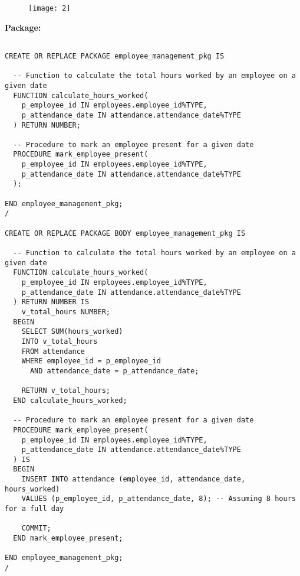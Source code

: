 \documentclass[11pt]{article} %
\begin{document}
\begin{figure}[h!]
  \centering
  \texttt{[image: 2]}
\end{figure}

\pagebreak

\textbf{Package:}

\begin{small}
\begin{verbatim}

CREATE OR REPLACE PACKAGE employee_management_pkg IS
  
  -- Function to calculate the total hours worked by an employee on a given date
  FUNCTION calculate_hours_worked(
    p_employee_id IN employees.employee_id%TYPE,
    p_attendance_date IN attendance.attendance_date%TYPE
  ) RETURN NUMBER;

  -- Procedure to mark an employee present for a given date
  PROCEDURE mark_employee_present(
    p_employee_id IN employees.employee_id%TYPE,
    p_attendance_date IN attendance.attendance_date%TYPE
  );

END employee_management_pkg;
/

CREATE OR REPLACE PACKAGE BODY employee_management_pkg IS

  -- Function to calculate the total hours worked by an employee on a given date
  FUNCTION calculate_hours_worked(
    p_employee_id IN employees.employee_id%TYPE,
    p_attendance_date IN attendance.attendance_date%TYPE
  ) RETURN NUMBER IS
    v_total_hours NUMBER;
  BEGIN
    SELECT SUM(hours_worked)
    INTO v_total_hours
    FROM attendance
    WHERE employee_id = p_employee_id
      AND attendance_date = p_attendance_date;

    RETURN v_total_hours;
  END calculate_hours_worked;

  -- Procedure to mark an employee present for a given date
  PROCEDURE mark_employee_present(
    p_employee_id IN employees.employee_id%TYPE,
    p_attendance_date IN attendance.attendance_date%TYPE
  ) IS
  BEGIN
    INSERT INTO attendance (employee_id, attendance_date, hours_worked)
    VALUES (p_employee_id, p_attendance_date, 8); -- Assuming 8 hours for a full day
    
    COMMIT;
  END mark_employee_present;

END employee_management_pkg;
/


\end{verbatim}
\end{small}

\pagebreak
\end{document}
